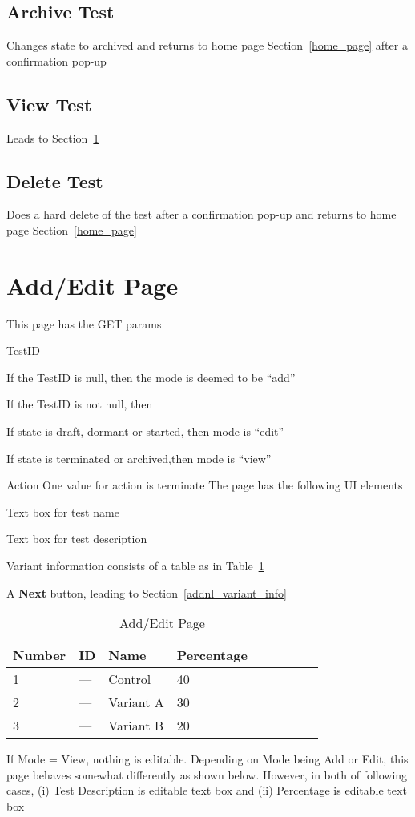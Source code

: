 \documentclass[letterpaper]{article}
\begin{document}
\subsection{Archive Test}
\label{archive_test}

Changes state to archived and returns to home page Section~\ref{home_page} after
a confirmation pop-up

\subsection{View Test}
\label{view_test}
Leads to Section~\ref{add_edit_page}

\subsection{Delete Test}
\label{del_test}

Does a hard delete of the test after a confirmation pop-up
and returns to home page Section~\ref{home_page}


\section{Add/Edit Page}
\label{add_edit_page}
This page has the GET params
\bd
\item [TestID]
\be
\item If the TestID is null, then the mode is deemed to be ``add''
\item If the TestID is not null, then 
\be
\item If state is draft, dormant or started, then mode is ``edit''
\item If state is terminated or archived,then mode is ``view''
\ee
\ee
\item [Action]
One value for action is terminate
\ed
The page has the following UI elements
\be
\item Text box for test name 
\item Text box for test description
\item Variant information consists of a table as in Table~\ref{tbl_page_1}
\item A {\bf Next} button, leading to Section~\ref{addnl_variant_info}
  \ee
\begin{table}[hb]
\centering
\begin{tabular}{|l||l|l|l|l|l|l|l|l|}  \hline \hline
  {\bf Number} &   {\bf ID} & {\bf Name} & {\bf Percentage} \\ \hline \hline
  1 & --- & Control & 40  \\ \hline
  2 & --- & Variant A & 30  \\ \hline
  3 & --- & Variant B & 20  \\ \hline
\hline
\end{tabular}
\caption{Add/Edit Page}
\label{tbl_page_1}
\end{table}
If Mode = View, nothing is editable. 
Depending on Mode being Add or Edit, this page behaves somewhat differently as shown below.
 However, in both of following cases, 
 (i)  Test Description is editable text box
 and (ii) Percentage is editable text box
\end{document}
